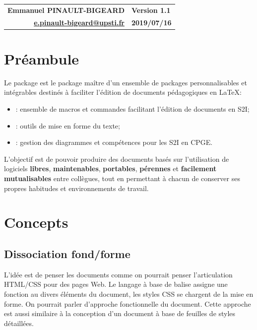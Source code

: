 \documentclass[11pt]{article}
\newcommand{\UPSTInumeroVersion}{1.1}
\begin{document}
\UPSTIbuildPage

\begin{table}[!ht]
\centering
\noindent\begin{tabular}{rl}
\textbf{Emmanuel PINAULT-BIGEARD} & \textbf{Version \UPSTInumeroVersion} \\ 
\textbf{\textcolor{UPSTIcustomColor1}{\href{mailto:e.pinault-bigeard@upsti.fr}{e.pinault-bigeard@upsti.fr}}}
 & \textbf{2019/07/16} \\
\end{tabular}
\end{table}

\setcounter{tocdepth}{2}
\tableofcontents

\pagebreak
\section{Préambule}
Le package  est le package \og maître\fg{} d'un ensemble de packages personnalisables et intégrables destinés à faciliter l'édition de documents pédagogiques en \LaTeX :
\begin{itemize}
\item {}: ensemble de macros et commandes facilitant l'édition de documents en S2I;
\item {}: outils de mise en forme du texte;
\item {}: gestion des diagrammes et compétences pour les S2I en CPGE.
\end{itemize}

L'objectif est de pouvoir produire des documents basés sur l'utilisation de logiciels \textbf{libres}, \textbf{maintenables}, \textbf{portables}, \textbf{pérennes} et \textbf{facilement mutualisables} entre collègues, tout en permettant à chacun de conserver ses propres habitudes et environnements de travail.


\section{Concepts}
\subsection{Dissociation fond/forme}
L'idée est de penser les documents comme on pourrait penser l'articulation HTML/CSS pour des pages Web. Le langage à base de balise assigne une fonction au divers éléments du document, les styles CSS se chargent de la mise en forme. On pourrait parler \og d'approche fonctionnelle\fg{} du document. Cette approche est aussi similaire à la conception d'un document  à base de feuilles de styles détaillées.
\end{document}
